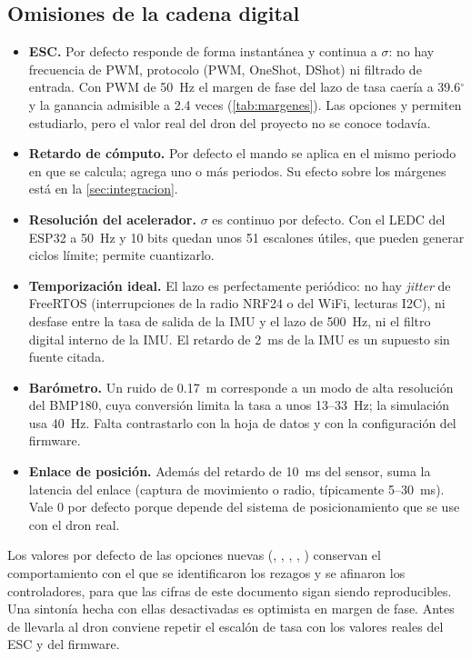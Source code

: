 \subsection{Omisiones de la cadena digital}

\begin{itemize}
\item \textbf{ESC.} Por defecto responde de forma instantánea y continua a
$\sigma$: no hay frecuencia de PWM, protocolo (PWM, OneShot, DShot) ni
filtrado de entrada. Con PWM de 50~Hz el margen de fase del lazo de tasa
caería a 39.6$^\circ$ y la ganancia admisible a 2.4 veces
(\cref{tab:margenes}). Las opciones  y
 permiten estudiarlo, pero el valor real del dron
del proyecto no se conoce todavía.
\item \textbf{Retardo de cómputo.} Por defecto el mando se aplica en el
mismo periodo en que se calcula;  agrega uno o
más periodos. Su efecto sobre los márgenes está en la
\cref{sec:integracion}.
\item \textbf{Resolución del acelerador.} $\sigma$ es continuo por defecto.
Con el LEDC del ESP32 a 50~Hz y 10 bits quedan unos 51 escalones útiles,
que pueden generar ciclos límite;  permite
cuantizarlo.
\item \textbf{Temporización ideal.} El lazo es perfectamente periódico: no
hay \emph{jitter} de FreeRTOS (interrupciones de la radio NRF24 o del WiFi,
lecturas I2C), ni desfase entre la tasa de salida de la IMU y el lazo de
500~Hz, ni el filtro digital interno de la IMU. El retardo de 2~ms de la IMU
es un supuesto sin fuente citada.
\item \textbf{Barómetro.} Un ruido de 0.17~m corresponde a un modo de alta
resolución del BMP180, cuya conversión limita la tasa a unos 13--33~Hz; la
simulación usa 40~Hz. Falta contrastarlo con la hoja de datos y con la
configuración del firmware.
\item \textbf{Enlace de posición.} Además del retardo de 10~ms del sensor,
 suma la latencia del enlace (captura de movimiento
o radio, típicamente 5--30~ms). Vale 0 por defecto porque depende del
sistema de posicionamiento que se use con el dron real.
\end{itemize}

Los valores por defecto de las opciones nuevas (,
, , ,
) conservan el
comportamiento con el que se identificaron los rezagos y se afinaron los
controladores, para que las cifras de este documento sigan siendo
reproducibles. Una sintonía hecha con ellas desactivadas es optimista en
margen de fase. Antes de llevarla al dron conviene repetir el escalón de
tasa con los valores reales del ESC y del firmware.

